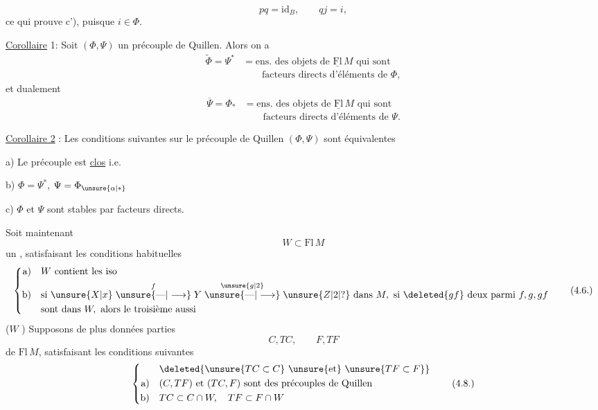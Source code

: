 \[
pq=\mathrm{id}_B,\qquad qj=i,
\]
ce qui prouve c'), puisque $i\in\Phi$.

\uline{Corollaire} 1: Soit $(\Phi,\Psi)$ un précouple de Quillen. Alors on a
\[
\begin{aligned}
\widetilde\Phi=\Psi^*&=\text{ens. des objets de }\underline{\mathrm{Fl}}\,M\text{ qui sont}\\
&\qquad\text{facteurs directs d'éléments de }\Phi,
\end{aligned}
\tag*{(4.3.)}
\]
et dualement
\[
\begin{aligned}
\overline\Psi=\Phi_*&=\text{ens. des objets de }\underline{\mathrm{Fl}}\,M\text{ qui sont}\\
&\qquad\text{facteurs directs d'éléments de }\Psi.
\end{aligned}
\tag*{(4.4)}
\]

\uline{Corollaire 2} : Les conditions suivantes sur le précouple de Quillen $(\Phi,\Psi)$ sont équivalentes

a) Le précouple est \uline{clos} i.e.  \inserted{$\Phi=\widetilde\Phi$, $\Psi=\overline\Psi$}

b) $\Phi=\Psi^*$, $\Psi=\Phi_{\unsure{\alpha|*}}$

c) $\Phi$ et $\Psi$ sont stables par facteurs directs.

Soit maintenant
\[
W\subset\mathrm{Fl}\,M
\tag*{(4.5.)}
\]
un , satisfaisant les conditions habituelles
\[
\left\{\begin{aligned}
\text{a)}\quad& W\text{ contient les iso}\\
\text{b)}\quad&\text{si }\unsure{X|x}\overset{f}{\mathrel{\unsure{\text{---}|\longrightarrow}}}Y\overset{\unsure{g|2}}{\mathrel{\unsure{\text{---}|\longrightarrow}}}\unsure{Z|2|?}\text{ dans }M,\text{ si }\deleted{gf}\text{ deux parmi }f,g,gf\\
&\text{sont dans }W,\text{ alors le troisième aussi}
\end{aligned}\right.
\tag*{(4.6.)}
\]
($W$  )  Supposons de plus données   parties
\[
C,TC,\qquad F,TF
\tag*{(4.7)}
\]
de $\mathrm{Fl}\,M$, satisfaisant les conditions suivantes
\[
\left\{\begin{aligned}
&\deleted{\unsure{TC\subset C}\ \unsure{\text{et}}\ \unsure{TF\subset F}}\\
\text{a)}\quad&(C,TF)\text{ et }(TC,F)\text{ sont des précouples de Quillen}\\
\text{b)}\quad&TC\subset C\cap W,\quad TF\subset F\cap W
\end{aligned}\right.
\tag*{(4.8.)}
\]
